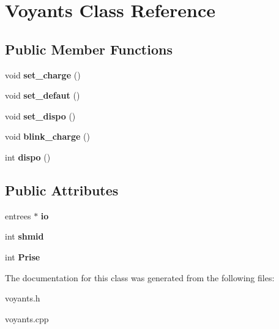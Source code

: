 \hypertarget{classVoyants}{}\section{Voyants Class Reference}
\label{classVoyants}
\subsection*{Public Member Functions}
\begin{DoxyCompactItemize}
\item 
\mbox{\label{classVoyants_a4bb4496af5a52b8e71b24f7196306563}} 
void {\bfseries set\+\_\+charge} ()
\item 
\mbox{\label{classVoyants_a90de83497234a87bc23428b341795571}} 
void {\bfseries set\+\_\+defaut} ()
\item 
\mbox{\label{classVoyants_a4f70cd793d038b760276ffa766097967}} 
void {\bfseries set\+\_\+dispo} ()
\item 
\mbox{\label{classVoyants_aa70caee71aa462737aa0cb5b03860a33}} 
void {\bfseries blink\+\_\+charge} ()
\item 
\mbox{\label{classVoyants_a5e926e0ed8ec69a09fd1661725c13610}} 
int {\bfseries dispo} ()
\end{DoxyCompactItemize}
\subsection*{Public Attributes}
\begin{DoxyCompactItemize}
\item 
\mbox{\label{classVoyants_acb40f64dd3c520e531580c735b135ed8}} 
entrees $\ast$ {\bfseries io}
\item 
\mbox{\label{classVoyants_a7af4c77e98932d2e1a78a017233f5dac}} 
int {\bfseries shmid}
\item 
\mbox{\label{classVoyants_a3b33314673138a6e84a0fb986141dbf0}} 
int {\bfseries Prise}
\end{DoxyCompactItemize}


The documentation for this class was generated from the following files\+:\begin{DoxyCompactItemize}
\item 
voyants.\+h\item 
voyants.\+cpp\end{DoxyCompactItemize}
